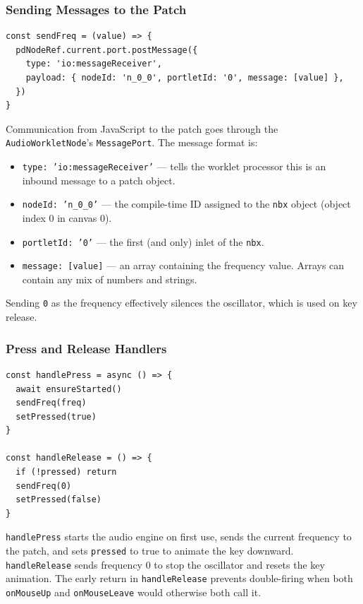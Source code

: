 \documentclass[12pt,a4paper]{article}
\begin{document}
\subsubsection{Sending Messages to the Patch}

\begin{lstlisting}[style=js, caption={sendFreq}]
const sendFreq = (value) => {
  pdNodeRef.current.port.postMessage({
    type: 'io:messageReceiver',
    payload: { nodeId: 'n_0_0', portletId: '0', message: [value] },
  })
}
\end{lstlisting}

Communication from JavaScript to the patch goes through the \texttt{AudioWorkletNode}'s \texttt{MessagePort}. The message format is:

\begin{itemize}
  \item \texttt{type: 'io:messageReceiver'} — tells the worklet processor this is an inbound message to a patch object.
  \item \texttt{nodeId: 'n\_0\_0'} — the compile-time ID assigned to the \texttt{nbx} object (object index 0 in canvas 0).
  \item \texttt{portletId: '0'} — the first (and only) inlet of the \texttt{nbx}.
  \item \texttt{message: [value]} — an array containing the frequency value. Arrays can contain any mix of numbers and strings.
\end{itemize}

Sending \texttt{0} as the frequency effectively silences the oscillator, which is used on key release.

\subsubsection{Press and Release Handlers}

\begin{lstlisting}[style=js, caption={handlePress and handleRelease}]
const handlePress = async () => {
  await ensureStarted()
  sendFreq(freq)
  setPressed(true)
}

const handleRelease = () => {
  if (!pressed) return
  sendFreq(0)
  setPressed(false)
}
\end{lstlisting}

\texttt{handlePress} starts the audio engine on first use, sends the current frequency to the patch, and sets \texttt{pressed} to true to animate the key downward. \texttt{handleRelease} sends frequency 0 to stop the oscillator and resets the key animation. The early return in \texttt{handleRelease} prevents double-firing when both \texttt{onMouseUp} and \texttt{onMouseLeave} would otherwise both call it.
\end{document}
